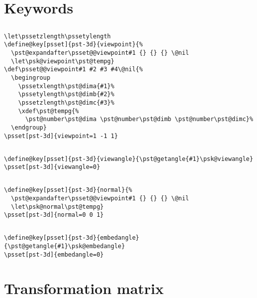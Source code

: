 \documentclass[11pt,english,BCOR10mm,DIV12,bibliography=totoc,parskip=false,smallheadings
    headexclude,footexclude,oneside,dvipsnames,svgnames]{pst-doc}
\begin{document}
\section{Keywords}
\subsection{}

\begin{lstlisting}
\let\pssetzlength\pssetylength
\define@key[psset]{pst-3d}{viewpoint}{%
  \pst@expandafter\psset@@viewpoint#1 {} {} {} \@nil
  \let\psk@viewpoint\pst@tempg}
\def\psset@@viewpoint#1 #2 #3 #4\@nil{%
  \begingroup
    \pssetxlength\pst@dima{#1}%
    \pssetylength\pst@dimb{#2}%
    \pssetzlength\pst@dimc{#3}%
    \xdef\pst@tempg{%
      \pst@number\pst@dima \pst@number\pst@dimb \pst@number\pst@dimc}%
  \endgroup}
\psset[pst-3d]{viewpoint=1 -1 1}
\end{lstlisting}

\subsection{}

\begin{lstlisting}
\define@key[psset]{pst-3d}{viewangle}{\pst@getangle{#1}\psk@viewangle}
\psset[pst-3d]{viewangle=0}
\end{lstlisting}

\subsection{}

\begin{lstlisting}
\define@key[psset]{pst-3d}{normal}{%
  \pst@expandafter\psset@@viewpoint#1 {} {} {} \@nil
  \let\psk@normal\pst@tempg}
\psset[pst-3d]{normal=0 0 1}
\end{lstlisting}


\subsection{}
\begin{lstlisting}
\define@key[psset]{pst-3d}{embedangle}{\pst@getangle{#1}\psk@embedangle}
\psset[pst-3d]{embedangle=0}
\end{lstlisting}


\section{Transformation matrix}
\end{document}
